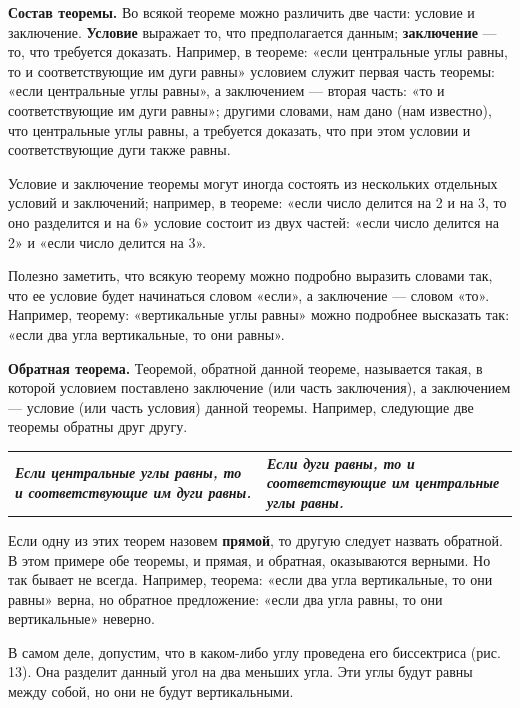 \documentclass[oneside]{book}
\begin{document}
\textbf{Состав теоремы.}
Во всякой теореме можно различить две части:
условие и заключение.
\textbf{Условие} выражает то, что предполагается данным;
\textbf{заключение} — то, что требуется доказать.
Например, в теореме:
«если центральные углы равны, то и соответствующие им дуги равны» условием служит первая часть теоремы:
«если центральные углы равны», а заключением — вторая часть:
«то и соответствующие им дуги равны»;
другими словами, нам дано (нам известно), что центральные углы равны, а требуется доказать, что при этом условии и соответствующие дуги также равны.

Условие и заключение теоремы могут иногда состоять из нескольких отдельных условий и заключений;
например, в теореме:
«если число делится на 2 и на 3, то оно разделится и на 6» условие состоит из двух частей:
«если число делится на 2» и «если число делится на 3».

Полезно заметить, что всякую теорему можно подробно выразить словами так, что ее условие будет начинаться словом «если», а заключение — словом «то».
Например, теорему:
«вертикальные углы равны» можно подробнее высказать так:
«если два угла вертикальные, то они равны».

\textbf{Обратная теорема.}
Теоремой, обратной данной теореме, называется такая, в которой условием поставлено заключение (или часть заключения), а заключением — условие (или часть условия) данной теоремы.
Например, следующие две теоремы обратны друг другу.

\medskip

\noindent
\begin{tabular}{ p{}| p{} }
\textbf{\emph{Если центральные углы равны, то и соответствующие им дуги равны.}}
&
\textbf{\emph{Если дуги равны, то и соответствующие им центральные углы равны.}}
\end{tabular}

\medskip

Если одну из этих теорем назовем \textbf{прямой}, то другую следует назвать обратной.
В этом примере обе теоремы, и прямая, и обратная, оказываются верными.
Но так бывает не всегда.
Например, теорема:
«если два угла вертикальные, то они равны» верна, но обратное предложение:
«если два угла равны, то они вертикальные» неверно.

В самом деле, допустим, что в каком-либо углу проведена его биссектриса (рис. 13).
Она разделит данный угол на два меньших угла.
Эти углы будут равны между собой, но они не будут вертикальными.
\end{document}
